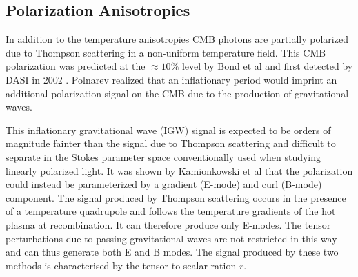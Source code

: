 \documentclass[12pt]{article}
\begin{document}






\subsection{Polarization Anisotropies}
In addition to the temperature anisotropies CMB photons are partially
polarized due to Thompson scattering in a non-uniform temperature field. This
CMB polarization was predicted at the $\approx 10\%$ level by Bond et al
\cite{cite:Bond} and first detected by DASI in 2002 \cite{cite:DASI}. Polnarev
\cite{cite:Polnarev} realized that an inflationary period would imprint an
additional polarization signal on the CMB due to the production of
gravitational waves. 

This inflationary gravitational wave (IGW) signal is expected to be orders of
magnitude fainter than the signal due to Thompson scattering and difficult to
separate in the Stokes parameter space conventionally used when studying
linearly polarized light. It was shown by Kamionkowski et al
\cite{cite:Kamionkowski} that the polarization could instead be parameterized
by a gradient (E-mode) and curl (B-mode) component. The signal produced by
Thompson scattering occurs in the presence of a temperature quadrupole and
follows the temperature gradients of the hot plasma at recombination. It can
therefore produce only E-modes. The tensor perturbations due to passing
gravitational waves are not restricted in this way and can thus generate both
E and B modes. The signal produced by these two methods is characterised by
the tensor to scalar ration $r$. 
\end{document}
